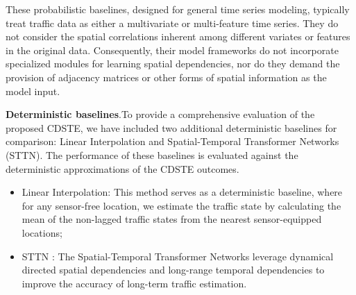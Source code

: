 \documentclass[a4paper,fleqn,12pt]{cas-sc}
\newcommand{\rev}[1]{{\color{red} #1}}
\begin{document}
These probabilistic baselines, designed for general time series modeling, typically treat traffic data as either a multivariate or multi-feature time series. They do not consider the spatial correlations inherent among different variates or features in the original data. Consequently, their model frameworks do not incorporate specialized modules for learning spatial dependencies, nor do they demand the provision of adjacency matrices or other forms of spatial information as the model input.

\rev{\noindent\textbf{Deterministic baselines}.To provide a comprehensive evaluation of the proposed CDSTE, we have included two additional deterministic baselines for comparison: Linear Interpolation and Spatial-Temporal Transformer Networks (STTN). The performance of these baselines is evaluated against the deterministic approximations of the CDSTE outcomes.
\begin{itemize}
  \item Linear Interpolation: This method serves as a deterministic baseline, where for any sensor-free location, we estimate the traffic state by calculating the mean of the non-lagged traffic states from the nearest sensor-equipped locations;
  \item STTN \citep{xu2020spatial}: The Spatial-Temporal Transformer Networks leverage dynamical directed spatial dependencies and long-range temporal dependencies to improve the accuracy of long-term traffic estimation.
\end{itemize}
}
\end{document}
